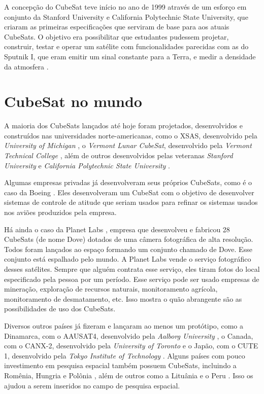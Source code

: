 \documentclass[
	12pt,				%
	openany,			%
	twoside,			%
	a4paper,			%
	english,			%
	french,				%
	spanish,			%
	brazil,				%
	oldfontcommands
	]{abntex2}
\begin{document}
A concepção do CubeSat teve início no ano de 1999 através de um esforço em conjunto da Stanford University e California Polytechnic State University, que criaram as primeiras especificações que serviram de base para aos atuais CubeSats. O objetivo era possibilitar que estudantes pudessem projetar, construir, testar e operar um satélite com funcionalidades parecidas com as do Sputnik I, que eram emitir um sinal constante para a Terra, e medir a densidade da atmosfera \cite{SmallSat}.

\section{CubeSat no mundo} 

A maioria dos CubeSats lançados até hoje foram projetados, desenvolvidos e construídos nas universidades norte-americanas, como o XSAS, desenvolvido pela \textit{University of Michigan} \cite{MCKAY}, o \textit{Vermont Lunar CubeSat}, desenvolvido pela \textit{Vermont Technical College} \cite{Vermont}, além de outros desenvolvidos pelas veteranas \textit{Stanford University} \cite{TWIGGS} e \textit{California Polytechnic State University} \cite{PolySat}.

Algumas empresas privadas já desenvolveram seus próprios CubeSats, como é o caso da Boeing \cite{Boeing}. Eles desenvolveram um CubeSat com o objetivo de desenvolver sistemas de controle de atitude que seriam usados para refinar os sistemas usados nos aviões produzidos pela empresa.

Há ainda o caso da Planet Labs \cite{PlanetLabs}, empresa que desenvolveu e fabricou 28 CubeSats (de nome Dove) dotados de uma câmera fotográfica de alta resolução. Todos foram lançados ao espaço formando um conjunto chamado de Dove. Esse conjunto está espalhado pelo mundo. A Planet Labs vende o serviço fotográfico desses satélites. Sempre que alguém contrata esse serviço, eles tiram fotos do local especificado pela pessoa por um período. Esse serviço pode ser usado empresas de mineração, exploração de recursos naturais, monitoramento agrícola, monitoramento de desmatamento, etc. Isso mostra o quão abrangente são as possibilidades de uso dos CubeSats.

Diversos outros países já fizeram e lançaram ao menos um protótipo, como a Dinamarca, com o AAUSAT4, desenvolvido pela \textit{Aalborg University} \cite{AAUSAT}, o Canada, com o CANX-2, desenvolvido pela \textit{University of Toronto} \cite{CANX} e o Japão, com o CUTE 1, desenvolvido pela \textit{Tokyo Institute of Technology} \cite{CUTE}. Alguns países com pouco investimento em pesquisa espacial também possuem CubeSats, incluindo a Romênia, Hungria e Polônia \cite{ESA}, além de outros como a Lituânia e o Peru \cite{SpaceNews}. Isso os ajudou a serem inseridos no campo de pesquisa espacial.
\end{document}
